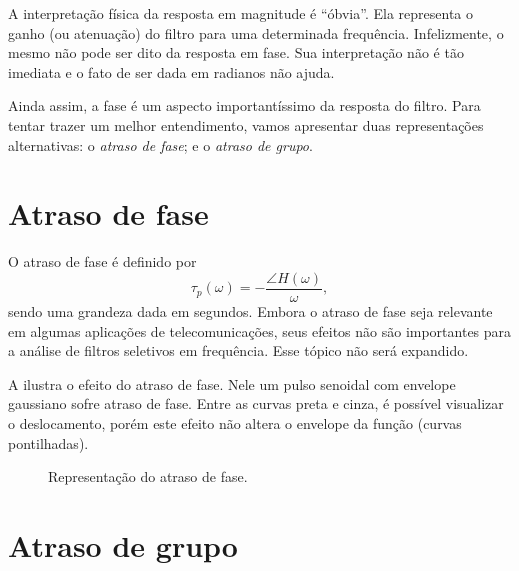 A interpretação física da resposta em magnitude é \enquote{óbvia}. Ela representa o ganho (ou atenuação) do filtro para uma determinada frequência. Infelizmente, o mesmo não pode ser dito da resposta em fase. Sua interpretação não é tão imediata e o fato de ser dada em radianos não ajuda.

Ainda assim, a fase é um aspecto importantíssimo da resposta do filtro. Para tentar trazer um melhor entendimento, vamos apresentar duas representações alternativas: o \emph{atraso de fase}; e o \emph{atraso de grupo}.

\section{Atraso de fase}

O atraso de fase é definido por
\begin{equation}
	\tau_p(\omega)=-\frac{\angle H(\omega)}{\omega},
\end{equation}
sendo uma grandeza dada em segundos. Embora o atraso de fase seja relevante em algumas aplicações de telecomunicações, seus efeitos não são importantes para a análise de filtros seletivos em frequência. Esse tópico não será expandido.

A  ilustra o efeito do atraso de fase. Nele um pulso senoidal com envelope gaussiano sofre atraso de fase. Entre as curvas preta e cinza, é possível visualizar o deslocamento, porém este efeito não altera o envelope da função (curvas pontilhadas).

\begin{figure}[ht]
	\centering
	\caption{Representação do atraso de fase.}
	\label{fig:taup}
\end{figure}

\section{Atraso de grupo}

